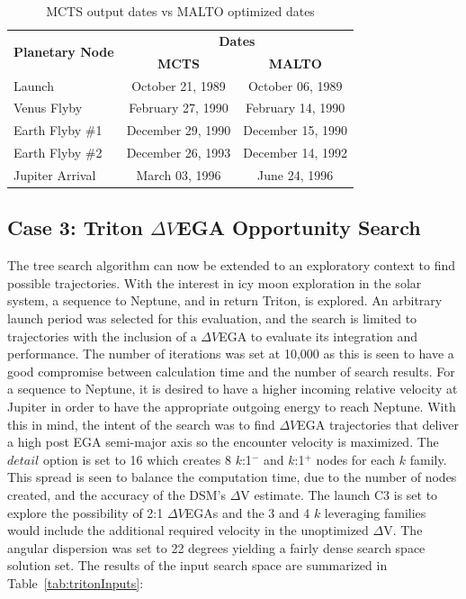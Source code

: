 \documentclass[letterpaper, preprint, paper,11pt]{AAS}	%
\begin{document}
\begin{table}[h!]
    \begin{center}
        \caption{MCTS output dates vs MALTO optimized dates}
        \label{table:galiMInputs}
        \begin{tabular}{lcc}
            \toprule
            \multirow{2}{*}{\textbf{Planetary Node}} & \multicolumn{2}{c}{\textbf{Dates}}\\
            \cmidrule{2-3}
            {} & \textbf{MCTS} & \textbf{MALTO}\\
            \midrule
            Launch          & October 21, 1989  & October 06, 1989\\
            Venus Flyby     & February 27, 1990 & February 14, 1990 \\ 
            Earth Flyby \#1 & December 29, 1990 & December 15, 1990 \\
            Earth Flyby \#2 & December 26, 1993 & December 14, 1992 \\
            Jupiter Arrival & March 03, 1996    & June 24, 1996 \\
            \bottomrule
        \end{tabular}
    \end{center}
\end{table}

\subsection{Case 3: Triton $\Delta V$EGA Opportunity Search}
The tree search algorithm can now be extended to an exploratory context to find possible trajectories. With the interest in icy moon exploration in the solar system, a sequence to Neptune, and in return Triton, is explored\cite{Hubbard2010}. An arbitrary launch period was selected for this evaluation, and the search is limited to trajectories with the inclusion of a $\Delta V$EGA to evaluate its integration and performance. The number of iterations was set at 10,000 as this is seen to have a good compromise between calculation time and the number of search results. For a sequence to Neptune, it is desired to have a higher incoming relative velocity at Jupiter in order to have the appropriate outgoing energy to reach Neptune. With this in mind, the intent of the search was to find $\Delta V$EGA trajectories that deliver a high post EGA semi-major axis so the encounter velocity is maximized. The $\textit{detail}$ option is set to 16 which creates 8 $k$:1$^{-}$ and $k$:1$^{+}$ nodes for each $k$ family. This spread is seen to balance the computation time, due to the number of nodes created, and the accuracy of the DSM's $\Delta$V estimate. The launch C3 is set to explore the possibility of 2:1 $\Delta V$EGAs and the 3 and 4 $k$ leveraging families  would include the additional required velocity in the unoptimized $\Delta$V. The angular dispersion was set to 22 degrees yielding a fairly dense search space solution set. The results of the input search space are summarized in Table~\ref{tab:tritonInputs}:
\end{document}
